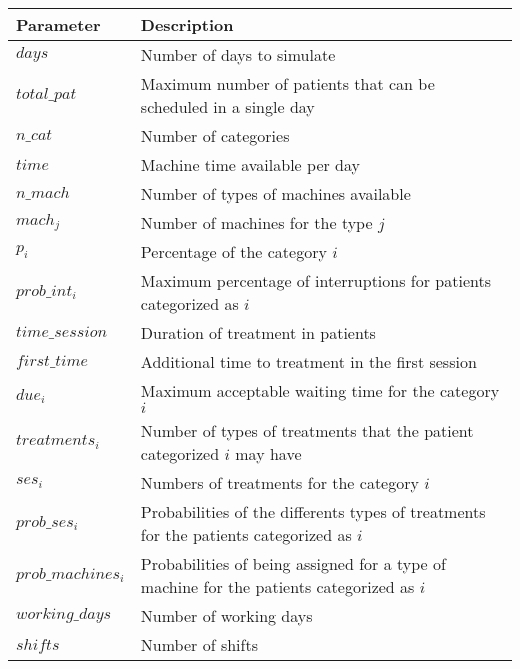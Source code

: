 \begin{tabular}{lp{10cm}}
\hline
 Parameter & Description\\
 \hline
 $days$ & Number of days to simulate\\
 $total\_pat$ & Maximum number of patients that can be scheduled in a single day\\
 $n\_cat$ & Number of categories\\
 $time$ & Machine time available per day\\
 $n\_mach$ & Number of types of machines available\\
 $mach_j$ & Number of machines for the type $j$\\
 $p_{i}$ & Percentage of the category $i$\\
 $prob\_int_i$ & Maximum percentage of interruptions for patients categorized as $i$\\
 $time\_session$ & Duration of treatment in patients\\
 $first\_time$ & Additional time to treatment in the first session\\
 $due_i$ & Maximum acceptable waiting time for the category $i$\\
 $treatments_i$ & Number of types of treatments that the patient categorized $i$ may have\\
 $ses_i$ & Numbers of treatments for the category $i$\\
 $prob\_ses_i$ & Probabilities of the differents types of treatments for the patients categorized as $i$\\
 $prob\_machines_i$ & Probabilities of being assigned for a type of machine for the patients categorized as $i$\\
 $working\_days$ & Number of working days\\
 $shifts$ & Number of shifts\\
\end{tabular}
